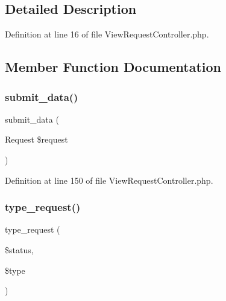 \subsection{Detailed Description}


Definition at line 16 of file View\+Request\+Controller.\+php.



\subsection{Member Function Documentation}
\mbox{\label{class_responsive_1_1_http_1_1_controllers_1_1_view_request_controller_a0112dc42f1d9ee6284954433b1ae26a8}} 
\subsubsection{\texorpdfstring{submit\_data()}{submit\_data()}}
{\footnotesize\ttfamily submit\+\_\+data (\begin{DoxyParamCaption}\item[{Request}]{\$request }\end{DoxyParamCaption})\hspace{0.3cm}{\ttfamily [protected]}}



Definition at line 150 of file View\+Request\+Controller.\+php.

\mbox{\label{class_responsive_1_1_http_1_1_controllers_1_1_view_request_controller_a4af631b8ccdfdad440eb388ddc481d5d}} 
\subsubsection{\texorpdfstring{type\_request()}{type\_request()}}
{\footnotesize\ttfamily type\+\_\+request (\begin{DoxyParamCaption}\item[{}]{\$status,  }\item[{}]{\$type }\end{DoxyParamCaption})}

